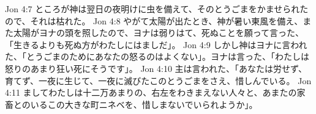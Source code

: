 Jon 4:7  ところが神は翌日の夜明けに虫を備えて、そのとうごまをかませられたので、それは枯れた。
Jon 4:8  やがて太陽が出たとき、神が暑い東風を備え、また太陽がヨナの頭を照したので、ヨナは弱りはて、死ぬことを願って言った、「生きるよりも死ぬ方がわたしにはましだ」。
Jon 4:9  しかし神はヨナに言われた、「とうごまのためにあなたの怒るのはよくない」。ヨナは言った、「わたしは怒りのあまり狂い死にそうです」。
Jon 4:10  主は言われた、「あなたは労せず、育てず、一夜に生じて、一夜に滅びたこのとうごまをさえ、惜しんでいる。
Jon 4:11  ましてわたしは十二万あまりの、右左をわきまえない人々と、あまたの家畜とのいるこの大きな町ニネベを、惜しまないでいられようか」。



